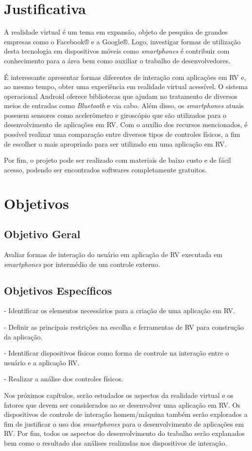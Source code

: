 \section{Justificativa}
\label{s.justificativa}

A realidade virtual é um tema em expansão, objeto de pesquisa de grandes empresas como o Facebook® e a Google®. Logo, investigar formas de utilização desta tecnologia em dispositivos móveis como \textit{smartphones} é contribuir com conhecimento para a área bem como auxiliar o trabalho de desenvolvedores. 

É interessante apresentar formas diferentes de interação com aplicações em RV e, ao mesmo tempo, obter uma experiência em realidade virtual acessível. O sistema operacional Android oferece bibliotecas que ajudam no tratamento de diversos meios de entradas como \textit{Bluetooth} e via cabo. Além disso, os \textit{smartphones} atuais possuem sensores como acelerômetro e giroscópio que são utilizados para o desenvolvimento de aplicações em RV. Com o auxílio dos recursos mencionados, é possível realizar uma comparação entre diversos tipos de controles físicos, a fim de escolher o mais apropriado para ser utilizado em uma aplicação em RV. 

Por fim, o projeto pode ser realizado com materiais de baixo custo e de fácil acesso, podendo ser encontrados softwares completamente gratuitos.

\section{Objetivos}
\label{s.objetivos}

\subsection{Objetivo Geral}
\label{s.geral}
Avaliar formas de interação do usuário em aplicação de RV executada em \textit{smartphones} por intermédio de um controle externo.

\subsection{Objetivos Específicos}
\label{s.especifico}
- Identificar os elementos necessários para a criação de uma aplicação em RV.

- Definir as principais restrições na escolha e ferramentas de RV para construção da aplicação.

- Identificar dispositivos físicos como forma de controle na interação entre o usuário e a aplicação RV.

- Realizar a análise dos controles físicos.

Nos próximos capítulos, serão estudados os aspectos da realidade virtual e os fatores que devem ser considerados ao se desenvolver uma aplicação em RV. Os dispositivos de controle de interação homem/máquina também serão explorados a fim de justificar o uso dos \textit{smartphones} para o desenvolvimento de aplicações em RV. Por fim, todos os aspectos do desenvolvimento do trabalho serão explanados bem como o resultado das análises realizadas nos dispositivos de interação. 

